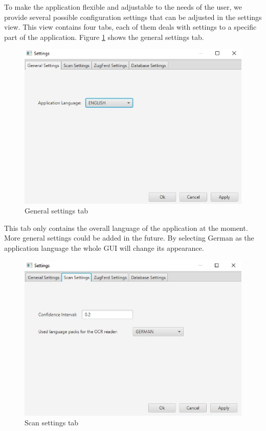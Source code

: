 To make the application flexible and adjustable to the needs of the user, we provide several possible configuration settings that can be adjusted in the settings view. This view contains four tabs, each of them deals with settings to a specific part of the application.
Figure \ref{settings_General} shows the general settings tab. 

\begin{figure}[ht!]
\centering
\includegraphics[scale=0.6]{Images/GUI/settings_General.jpg}
\caption{General settings tab \label{settings_General}}
\end{figure}

This tab only contains the overall language of the application at the moment. More general settings could be added in the future. By selecting German as the application language the whole GUI will change its appearance.

\begin{figure}[ht!]
\centering
\includegraphics[scale=0.6]{Images/GUI/settings_Scan.jpg}
\caption{Scan settings tab \label{settings_Scan}}
\end{figure}

